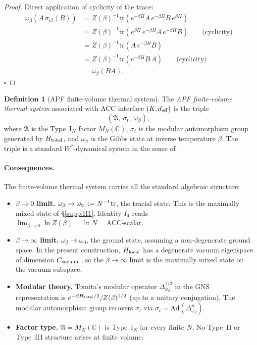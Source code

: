 \documentclass[11pt]{article}
\theoremstyle{plain}
\theoremstyle{definition}
\newtheorem{definition}[theorem]{Definition}
\theoremstyle{remark}
\begin{document}
\begin{proof}
Direct application of cyclicity of the trace:
\begin{align*}
  \omega_\beta(A\, \sigma_{i\beta}(B))
  &= Z(\beta)^{-1} \mathrm{tr}(e^{-\beta H} A\, e^{-\beta H} B\, e^{\beta H}) \\
  &= Z(\beta)^{-1} \mathrm{tr}(e^{\beta H}\, e^{-\beta H} A\, e^{-\beta H} B) \qquad \text{(cyclicity)} \\
  &= Z(\beta)^{-1} \mathrm{tr}(A\, e^{-\beta H} B) \\
  &= Z(\beta)^{-1} \mathrm{tr}(e^{-\beta H} B\, A) \qquad \text{(cyclicity)} \\
  &= \omega_\beta(B A).
\end{align*}
$\square$
\end{proof}

\begin{definition}[APF finite-volume thermal system]\label{def:apf_thermal_system}
The \emph{APF finite-volume thermal system} associated with ACC interface $(K, d_{\rm eff})$ is the triple
\[
  (\mathfrak{A},\ \sigma_t,\ \omega_\beta),
\]
where $\mathfrak{A}$ is the Type~I$_N$ factor $M_N(\mathbb{C})$, $\sigma_t$ is the modular automorphism group generated by $H_{\rm total}$, and $\omega_\beta$ is the Gibbs state at inverse temperature $\beta$.  The triple is a standard $W^*$-dynamical system in the sense of~\cite{BratelliRobinson}.
\end{definition}

\paragraph{Consequences.}  The finite-volume thermal system carries all the standard algebraic structure:
\begin{itemize}[leftmargin=2em,itemsep=3pt]
  \item \textbf{$\beta \to 0$ limit.}  $\omega_\beta \to \omega_{\rm tr} := N^{-1} \mathrm{tr}$, the tracial state.  This is the maximally mixed state of \S\ref{supp:H1}.  Identity $I_4$ reads $\lim_{\beta\to 0} \ln Z(\beta) = \ln N = \mathrm{ACC}\text{-scalar}$.
  \item \textbf{$\beta \to \infty$ limit.}  $\omega_\beta \to \omega_0$, the ground state, assuming a non-degenerate ground space.  In the present construction, $H_{\rm local}$ has a degenerate vacuum eigenspace of dimension $C_{\rm vacuum}$, so the $\beta \to \infty$ limit is the maximally mixed state on the vacuum subspace.
  \item \textbf{Modular theory.}  Tomita's modular operator $\Delta_{\omega_\beta}^{1/2}$ in the GNS representation is $e^{-\beta H_{\rm total}/2} / Z(\beta)^{1/2}$ (up to a unitary conjugation).  The modular automorphism group recovers $\sigma_t$ via $\sigma_t = \mathrm{Ad}(\Delta_{\omega_\beta}^{it})$.
  \item \textbf{Factor type.}  $\mathfrak{A} = M_N(\mathbb{C})$ is Type~I$_N$ for every finite $N$.  No Type~II or Type~III structure arises at finite volume.
\end{itemize}
\end{document}
